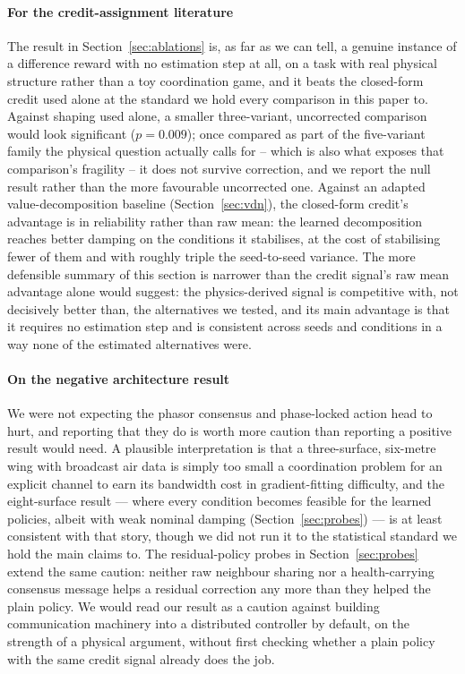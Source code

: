 \documentclass[preprint,11pt,authoryear]{elsarticle}
\begin{document}
\paragraph{For the credit-assignment literature}
The result in Section~\ref{sec:ablations} is, as far as we can tell, a genuine
instance of a difference reward with no estimation step at all, on a task with
real physical structure rather than a toy coordination game, and it beats the
closed-form credit used alone at the standard we hold every comparison in this
paper to. Against shaping used alone, a smaller three-variant, uncorrected
comparison would look significant ($p=0.009$); once compared as part of the
five-variant family the physical question actually calls for -- which is also
what exposes that comparison's fragility -- it does not survive correction,
and we report the null result rather than the more favourable uncorrected
one. Against an adapted value-decomposition baseline (Section~\ref{sec:vdn}),
the closed-form credit's advantage is in reliability rather than raw mean: the
learned decomposition reaches better damping on the conditions it stabilises,
at the cost of stabilising fewer of them and with roughly triple the
seed-to-seed variance. The more defensible summary of this section is
narrower than the credit signal's raw mean advantage alone would suggest: the
physics-derived signal is competitive with, not decisively better than, the
alternatives we tested, and its main advantage is that it requires no
estimation step and is consistent across seeds and conditions in a way none
of the estimated alternatives were.

\paragraph{On the negative architecture result}
We were not expecting the phasor consensus and phase-locked action head to
hurt, and reporting that they do is worth more caution than reporting a positive
result would need. A plausible interpretation is that a three-surface, six-metre
wing with broadcast air data is simply too small a coordination problem for an
explicit channel to earn its bandwidth cost in gradient-fitting difficulty, and
the eight-surface result --- where every condition becomes feasible for the
learned policies, albeit with weak nominal damping (Section~\ref{sec:probes})
--- is at least consistent with that story, though we did not run it to the
statistical standard we hold the main claims to. The residual-policy probes in
Section~\ref{sec:probes} extend the same caution: neither raw neighbour
sharing nor a health-carrying consensus message helps a residual correction any
more than they helped the plain policy. We would read our result as a caution
against building
communication machinery into a distributed controller by default, on the
strength of a physical argument, without first checking whether a plain policy
with the same credit signal already does the job.
\end{document}
